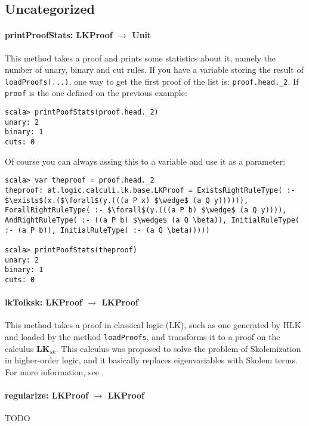 \documentclass[a4paper, 11pt]{report}
\begin{document}
\subsection{Uncategorized}

\paragraph{\textbf{printProofStats: LKProof $\rightarrow$ Unit}}
This method takes a proof and prints some statistics about it, namely the number
of unary, binary and cut rules. If you have a variable storing the result of 
\texttt{loadProofs(...)}, one way to get the first proof of the list is: 
\texttt{proof.head.\_2}. If \texttt{proof} is the one defined on the previous 
example:

\begin{lstlisting}
scala> printPoofStats(proof.head._2)
unary: 2
binary: 1
cuts: 0
\end{lstlisting}

Of course you can always assing this to a variable and use it as a parameter:

\begin{lstlisting}
scala> var theproof = proof.head._2
theproof: at.logic.calculi.lk.base.LKProof = ExistsRightRuleType( :- $\exists$(x.($\forall$(y.(((a P x) $\wedge$ (a Q y)))))), ForallRightRuleType( :- $\forall$(y.(((a P b) $\wedge$ (a Q y)))), AndRightRuleType( :- ((a P b) $\wedge$ (a Q \beta)), InitialRuleType( :- (a P b)), InitialRuleType( :- (a Q \beta)))))

scala> printPoofStats(theproof)
unary: 2
binary: 1
cuts: 0
\end{lstlisting}

\paragraph{\textbf{lkTolksk: LKProof $\rightarrow$ LKProof}}
This method takes a proof in classical logic (LK), such as one generated by HLK and 
loaded by the method \texttt{loadProofs}, and transforms it to a proof on the
calculus $\mathbf{LK}_{sk}$. This calculus was proposed to solve the problem of
Skolemization in higher-order logic, and it basically replaces eigenvariables
with Skolem terms. For more information, see \cite{Hetzl2011}.

\paragraph{\textbf{regularize: LKProof $\rightarrow$ LKProof}}
{\color{red}TODO}
\end{document}
